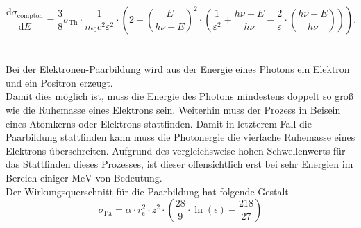 \begin{equation}
  \label{eqn:dsig}
  \frac{\mathrm{d}\sigma_\text{compton}}{\mathrm{d}E} = \frac{3}{8} \sigma_\text{Th}
  \cdot \frac{1}{m_{0} c^2 \varepsilon^2} \cdot \left(  2 + \left( \frac{E}{h\nu - E} \right)^2
  \cdot \left( \frac{1}{\varepsilon^2} + \frac{h\nu - E}{h\nu} - \frac{2}{\varepsilon}
  \cdot \left( \frac{h\nu - E}{h\nu} \right) \right) \right) .
\end{equation}
\\ \\
Bei der Elektronen-Paarbildung wird aus der Energie eines Photons ein Elektron und ein Positron erzeugt.\\
Damit dies möglich ist, muss die Energie des Photons mindestens doppelt so groß wie die Ruhemasse eines Elektrons
sein. Weiterhin muss der Prozess in Beisein eines Atomkerns oder Elektrons stattfinden. Damit in letzterem Fall
die Paarbildung stattfinden kann muss die Photonergie die vierfache Ruhemasse eines Elektrons überschreiten.
Aufgrund des vergleichsweise hohen Schwellenwerts für das Stattfinden dieses Prozesses, ist dieser offensichtlich erst bei sehr Energien im
Bereich einiger $\si{\mega\electronvolt}$ von Bedeutung.\\
Der Wirkungsquerschnitt für die Paarbildung hat folgende Gestalt
\begin{equation}
  \label{eqn:paarbildung}
  \sigma_\text{Pa} = \alpha \cdot r_\text{e}^2 \cdot z^2 \cdot \left( \frac{28}{9} \cdot \ln\left( \epsilon \right) - \frac{218}{27} \right)
\end{equation}

